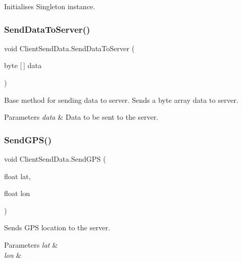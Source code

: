 Initialises Singleton instance. 

\mbox{\label{class_client_send_data_aad890f1086f0ac1b345b353cf1f9710e}} 
\subsubsection{\texorpdfstring{SendDataToServer()}{SendDataToServer()}}
{\footnotesize\ttfamily void Client\+Send\+Data.\+Send\+Data\+To\+Server (\begin{DoxyParamCaption}\item[{byte \mbox{[}$\,$\mbox{]}}]{data }\end{DoxyParamCaption})\hspace{0.3cm}{\ttfamily [private]}}



Base method for sending data to server. Sends a byte array data to server. 


\begin{DoxyParams}{Parameters}
{\em data} & Data to be sent to the server.\\
\hline
\end{DoxyParams}
\mbox{\label{class_client_send_data_aed0b71505a76cb58a2b0c58ad239748b}} 
\subsubsection{\texorpdfstring{SendGPS()}{SendGPS()}}
{\footnotesize\ttfamily void Client\+Send\+Data.\+Send\+G\+PS (\begin{DoxyParamCaption}\item[{float}]{lat,  }\item[{float}]{lon }\end{DoxyParamCaption})}



Sends G\+PS location to the server. 


\begin{DoxyParams}{Parameters}
{\em lat} & \\
\hline
{\em lon} & \\
\hline
\end{DoxyParams}
\mbox{\label{class_client_send_data_abea10903c98ebd507bbb48b80a7c1b6f}} 
